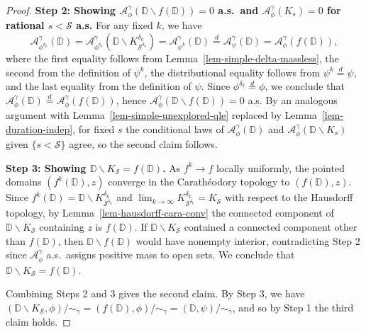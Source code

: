 \documentclass[a4paper]{article}
\numberwithin{equation}{section}
\newcommand{\D}{\mathbb{D}}
\newcommand{\cA}{\mathcal{A}}
\newcommand{\qduration}{\mathcal{S}}
\theoremstyle{remark}
\numberwithin{equation}{section}
\begin{document}
\begin{proof}
\medskip 
\noindent 
\textbf{Step 2: Showing $\cA^\gamma_\phi(\D \backslash f(\D)) = 0$ a.s.\ and $\cA^\gamma_\phi(K_s) = 0$ for rational $s < \qduration$ a.s.} For any fixed $k$, we have
    \[\cA^\gamma_{\phi^{\delta_k}}(\D) = \cA^\gamma_{\phi^{\delta_k}}(\D \backslash K^{\delta_k}_{\qduration^{\delta_k}}) = \cA^\gamma_{\psi^k}(\D) \stackrel d= \cA^\gamma_\psi(\D) = \cA^\gamma_{\phi}(f(\D)),\]
    where the first equality follows from Lemma~\ref{lem-simple-delta-massless}, the second from the definition of $\psi^k$, the distributional equality follows from $\psi^k \stackrel d= \psi$, and the last equality from the definition of $\psi$. Since $\phi^{\delta_k} \stackrel d= \phi$, we conclude that $\cA^\gamma_\phi(\D) \stackrel d= \cA^\gamma_\phi(f(\D))$, hence $\cA^\gamma_\phi(\D \backslash f(\D)) = 0$ a.s. By an analogous argument with Lemma~\ref{lem-simple-unexplored-qle} replaced by Lemma~\ref{lem-duration-indep}, for fixed $s$ the conditional laws of $\cA_\phi^\gamma(\D)$ and $\cA_\phi^\gamma (\D \backslash K_s)$ given $\{ s < \qduration\}$ agree, so the second claim follows. 

\medskip 
\noindent \textbf{Step 3: Showing $\D \backslash K_\qduration = f(\D)$.}
    As $f^k \to f$ locally uniformly, %
    the pointed domains $(f^k(\D), z)$ converge in the Carath\'eodory topology to $(f(\D), z)$. Since $f^k(\D) = \D \backslash K_{\qduration^{\delta_k}}^{\delta_k}$ and $\lim_{k \to \infty} K_{\qduration^{\delta_k}}^{\delta_k} = K_\qduration$ with respect to the Hausdorff topology, by Lemma~\ref{lem-hausdorff-cara-conv} the connected component of $\D \backslash K_\qduration$ containing $z$ is $f(\D)$. 
    If $\D \backslash K_\qduration$ contained a connected component other than $f(\D)$, then $\D \backslash f(\D)$ would have nonempty interior, contradicting Step 2 since $\cA^\gamma_\phi$ a.s.\ assigns positive mass to open sets. We conclude that $\D \backslash K_\qduration = f(\D)$. 

 
    Combining Steps 2 and 3 gives the second claim. By Step 3, we have $(\D \backslash K_\qduration, \phi)/{\sim_\gamma} = (f(\D), \phi)/{\sim_\gamma} = (\D, \psi)/{\sim_\gamma}$, and so by Step 1 the third claim holds.


\end{proof}
\end{document}
